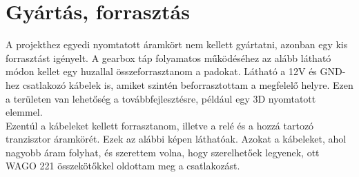 \section{Gyártás, forrasztás}
A projekthez egyedi nyomtatott áramkört nem kellett gyártatni, azonban egy kis forrasztást igényelt. A gearbox táp folyamatos működéséhez az alább látható módon kellet egy huzallal összeforrasztanom a padokat. Látható a 12V és GND-hez csatlakozó kábelek is, amiket szintén beforrasztottam a megfelelő helyre. Ezen a területen van lehetőség a továbbfejlesztésre, például egy 3D nyomtatott elemmel.\\

Ezentúl a kábeleket kellett forrasztanom, illetve a relé és a hozzá tartozó tranzisztor áramkörét. Ezek az alábbi képen láthatóak. Azokat a kábeleket, ahol nagyobb áram folyhat, és szerettem volna, hogy szerelhetőek legyenek, ott WAGO 221 összekötőkkel oldottam meg a csatlakozást.
